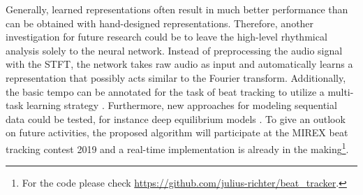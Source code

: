 \documentclass{scrartcl}
\begin{document}
Generally, learned representations often result in much better performance than can be obtained with hand-designed representations. Therefore, another investigation for future research could be to leave the high-level rhythmical analysis solely to the neural network. Instead of preprocessing the audio signal with the STFT, the network takes raw audio as input and automatically learns a representation that possibly acts similar to the Fourier transform. Additionally, the basic tempo can be annotated for the task of beat tracking to utilize a multi-task learning strategy \cite{Boeck2019}. Furthermore, new approaches for modeling sequential data could be tested, for instance deep equilibrium models \cite{Bai2019b}. To give an outlook on future activities, the proposed algorithm will participate at the MIREX beat tracking contest 2019 and a real-time implementation is already in the making\footnote{For the code please check \url{https://github.com/julius-richter/beat_tracker}.}.






\newpage 


\end{document}
